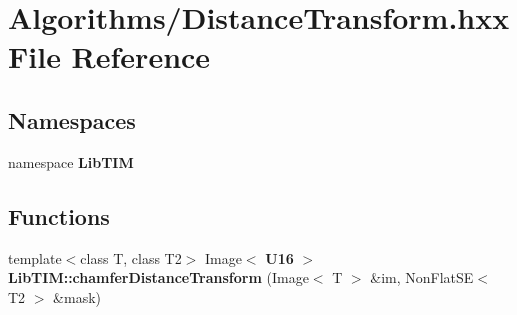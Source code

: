 \section{Algorithms/Distance\-Transform.hxx File Reference}
\label{DistanceTransform_8hxx}
\subsection*{Namespaces}
\begin{CompactItemize}
\item 
namespace {\bf Lib\-TIM}
\end{CompactItemize}
\subsection*{Functions}
\begin{CompactItemize}
\item 
template$<$class T, class T2$>$ Image$<$ {\bf U16} $>$ {\bf Lib\-TIM::chamfer\-Distance\-Transform} (Image$<$ T $>$ \&im, Non\-Flat\-SE$<$ T2 $>$ \&mask)
\end{CompactItemize}
